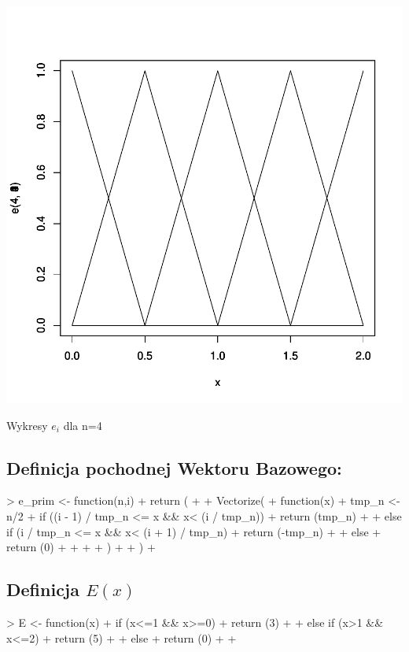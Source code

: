 \documentclass{article}
\begin{document}
\begin{centerfig}
\includegraphics{Report-003}
\caption{Wykresy \(e_i\) dla n=4}
\end{centerfig}


\subsection{Definicja pochodnej Wektoru Bazowego:}

\begin{Schunk}
\begin{Sinput}
> e_prim <- function(n,i){
+   return (
+     
+     Vectorize(
+       function(x){
+         tmp_n <- n/2
+         if ((i - 1) / tmp_n <= x  && x< (i / tmp_n)){
+           return (tmp_n)
+         }
+         else if (i / tmp_n <= x && x< (i + 1) / tmp_n){
+           return (-tmp_n)
+         }
+         else{
+           return (0)
+         }
+         
+       }
+     )
+     
+   )
+ }
\end{Sinput}
\end{Schunk}

\subsection{Definicja \(E(x)\)}
\begin{Schunk}
\begin{Sinput}
> E <- function(x){
+   if (x<=1 && x>=0){
+     return (3)
+   }  
+   else if (x>1 && x<=2){
+     return (5)
+   }
+   else {
+     return (0)
+   }
+ }
\end{Sinput}
\end{Schunk}
\end{document}

